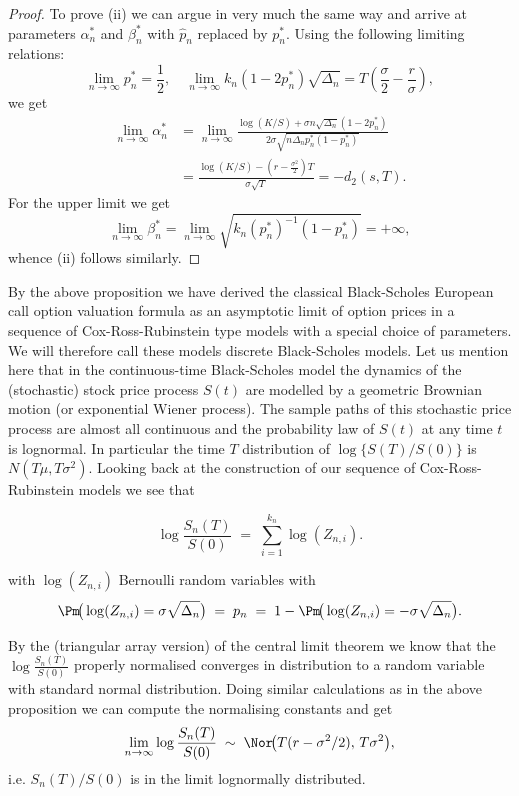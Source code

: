 \begin{proof}
	To prove (ii) we can argue in very much the same way and arrive at parameters $\alpha_n^*$ and $\beta_n^*$ with $\hat{p}_n$ replaced by $p_n^*$. Using the following limiting relations:
	\[
		\lim_{n\to\infty} p_n^* = \frac{1}{2}, \quad \lim_{n\to\infty} k_n(1 - 2p_n^*)\sqrt{\Delta_n} = T \left(\frac{\sigma}{2} - \frac{r}{\sigma}\right),
	\]
	we get
	\begin{align*}
		\lim_{n\to\infty} \alpha_n^* & = \lim_{n\to\infty} \frac{\log(K/S) + \sigma n \sqrt{\Delta_n}(1 - 2p_n^*)}{2\sigma \sqrt{n\Delta_n p_n^*(1 - p_n^*)}} \\
		                             & = \frac{\log(K/S) - (r - \frac{\sigma^2}{2})T}{\sigma\sqrt{T}} = -d_2(s, T).
	\end{align*}
	For the upper limit we get
	\[
		\lim_{n\to\infty} \beta_n^* = \lim_{n\to\infty} \sqrt{k_n (p_n^*)^{-1}(1 - p_n^*)} = +\infty,
	\]
	whence (ii) follows similarly.
\end{proof}

By the above proposition we have derived the classical Black-Scholes European call option valuation formula as an asymptotic limit of option prices in a sequence of Cox-Ross-Rubinstein type models with a special choice of parameters. We will therefore call these models discrete Black-Scholes models. Let us mention here that in the continuous-time Black-Scholes model the dynamics of the (stochastic) stock price process $S(t)$ are modelled by a geometric Brownian motion (or exponential Wiener process). The sample paths of this stochastic price process are almost all continuous and the probability law of $S(t)$ at any time $t$ is lognormal. In particular the time $T$ distribution of $\log\{S(T)/S(0)\}$ is $N(T\mu, T\sigma^2)$. Looking back at the construction of our sequence of Cox-Ross-Rubinstein models we see that

\begin{equation}
	\log\frac{S_n(T)}{S(0)} \;=\; \sum_{i=1}^{k_n} \log(Z_{n,i}).
\end{equation}

with \(\log(Z_{n,i})\) Bernoulli random variables with
\begin{equation}
	\Pm\!\big(\log(Z_{n,i})=\sigma\sqrt{\Delta_n}\big) \;=\; p_n
	\;=\; 1 - \Pm\!\big(\log(Z_{n,i})=-\sigma\sqrt{\Delta_n}\big).
\end{equation}

By the (triangular array version) of the central limit theorem we know that the
\(\log \frac{S_n(T)}{S(0)}\) properly normalised converges in distribution to a random
variable with standard normal distribution. Doing similar calculations as in the above
proposition we can compute the normalising constants and get
\begin{equation}
	\lim_{n\to\infty} \log\frac{S_n(T)}{S(0)} \;\sim\; \Nor\!\big(T(r-\sigma^2/2),\,T\sigma^2\big),
\end{equation}
i.e. \(S_n(T)/S(0)\) is in the limit lognormally distributed.

